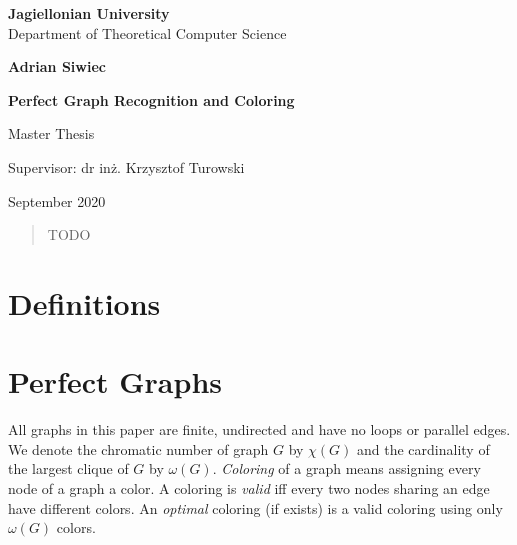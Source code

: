\documentclass{article}
\author{Adrian Siwiec}
\date{\today{}}
\begin{document}
\begin{titlepage}
	\begin{center}
        
		\large
		\textbf{Jagiellonian University}\\
		Department of Theoretical Computer Science\\

		\vspace{1.5cm}

		\Large
		\textbf{Adrian Siwiec}

		\vspace*{2cm}

		\textbf{\LARGE Perfect Graph Recognition and Coloring}
		
		\vspace{0.5cm}
		\large
		
		\vfill
		\Large
		Master Thesis

		\vfill
		\Large
		Supervisor: dr inż. Krzysztof Turowski
		
		\vspace{0.8cm}
		
		September 2020
		
\end{center}
\end{titlepage}

\pagebreak

\begin{abstract}
TODO
\end{abstract}

\listoftheorems[ignoreall,show={defn}]
\tableofcontents

\pagebreak

\section{Definitions}


\section{Perfect Graphs}



All graphs in this paper are finite, undirected and have no loops or parallel edges. We denote the chromatic number of graph $G$ by $\chi(G)$ and the cardinality of the largest clique of $G$ by $\omega(G)$. \emph{Coloring} of a graph means assigning every node of a graph a color. A coloring is \emph{valid} iff every two nodes sharing an edge have different colors. An \emph{optimal} coloring (if exists) is a valid coloring using only $\omega(G)$ colors.
\end{document}
